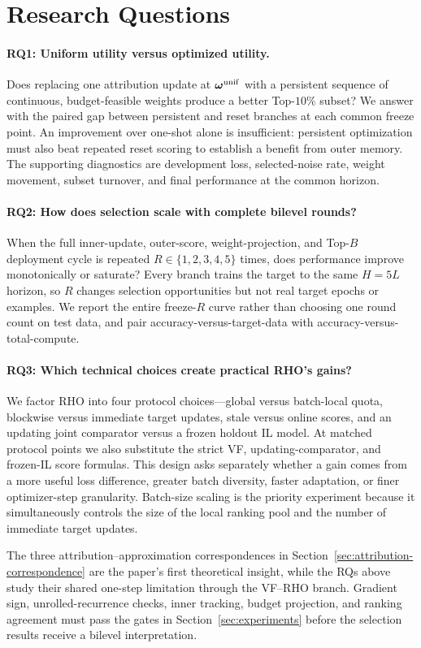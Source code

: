 \section{Research Questions}
\label{sec:rqs}

\paragraph{RQ1: Uniform utility versus optimized utility.}
Does replacing one attribution update at
${\bm{\omega}}^{\mathrm{unif}}$ with a persistent sequence of continuous,
budget-feasible weights produce a better Top-$10\%$ subset? We answer with the
paired gap between persistent and reset branches at each common freeze point.
An improvement over one-shot alone is insufficient: persistent optimization
must also beat repeated reset scoring to establish a benefit from outer
memory. The supporting diagnostics are development loss, selected-noise rate,
weight movement, subset turnover, and final performance at the common horizon.

\paragraph{RQ2: How does selection scale with complete bilevel rounds?}
When the full inner-update, outer-score, weight-projection, and Top-$B$
deployment cycle is repeated $R\in\{1,2,3,4,5\}$ times, does performance
improve monotonically or saturate? Every branch trains the target to the same
$H=5L$ horizon, so $R$ changes selection opportunities but not real target
epochs or examples. We report the entire freeze-$R$ curve rather than choosing
one round count on test data, and pair accuracy-versus-target-data with
accuracy-versus-total-compute.

\paragraph{RQ3: Which technical choices create practical RHO's gains?}
We factor RHO into four protocol choices---global versus batch-local quota,
blockwise versus immediate target updates, stale versus online scores, and an
updating joint comparator versus a frozen holdout IL model. At matched protocol
points we also substitute the strict VF, updating-comparator, and frozen-IL
score formulas. This design asks separately whether a gain comes from a more
useful loss difference, greater batch diversity, faster adaptation, or finer
optimizer-step granularity. Batch-size scaling is the priority experiment
because it simultaneously controls the size of the local ranking pool and the
number of immediate target updates.

The three attribution--approximation correspondences in
Section~\ref{sec:attribution-correspondence} are the paper's first theoretical
insight, while the RQs above study their shared one-step limitation through the
VF--RHO branch. Gradient sign, unrolled-recurrence checks, inner tracking,
budget projection, and ranking agreement must pass the gates in
Section~\ref{sec:experiments} before the selection results receive a bilevel
interpretation.
